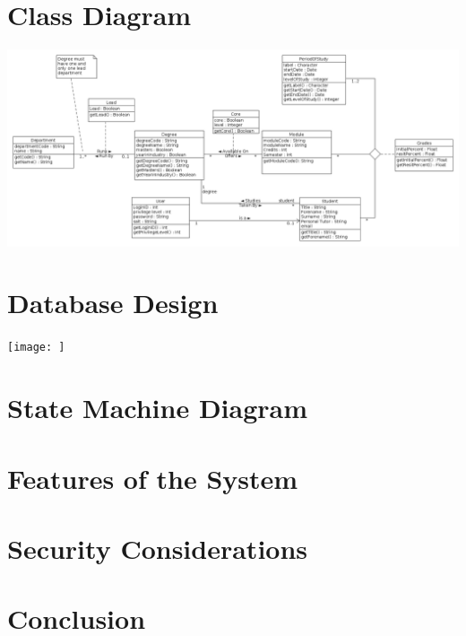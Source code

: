 \documentclass[12pt,a4paper]{article}
\begin{document}
\section{Class Diagram}

\centerline{\includegraphics[width=20cm]{classDiagram1}}


\section{Database Design}

\centerline{\texttt{[image: ]}}

\section{State Machine Diagram}

\section{Features of the System}

\section{Security Considerations}

\section{Conclusion}
\end{document}

